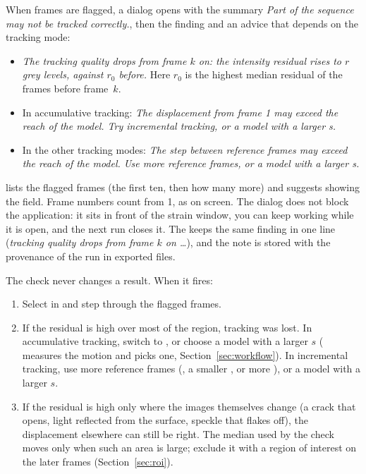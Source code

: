 When frames are flagged, a  dialog opens with the summary \emph{Part
of the sequence may not be tracked correctly.}, then the finding and an advice that depends on the
tracking mode:

\begin{itemize}
  \item \emph{The tracking quality drops from frame $k$ on: the intensity residual rises to $r$
        grey levels, against $r_0$ before.} Here $r_0$ is the highest median residual of the
        frames before frame~$k$.
  \item In accumulative tracking: \emph{The displacement from frame 1 may exceed the reach of the
        model. Try incremental tracking, or a model with a larger s.}
  \item In the other tracking modes: \emph{The step between reference frames may exceed the reach
        of the model. Use more reference frames, or a model with a larger s.}
\end{itemize}

 lists the flagged frames (the first ten, then how many more) and suggests
showing the  field. Frame numbers count from 1, as on screen. The dialog does not
block the application: it sits in front of the strain window, you can keep working while it is
open, and the next run closes it. The  keeps the same finding in one line
(\emph{tracking quality drops from frame $k$ on \ldots}), and the note is stored with the
provenance of the run in exported files.

The check never changes a result. When it fires:

\begin{enumerate}
  \item Select  in  and step through the flagged frames.
  \item If the residual is high over most of the region, tracking was lost. In accumulative
        tracking, switch  to , or choose a model with a larger
        $s$ ( measures the motion and picks one,
        Section~\ref{sec:workflow}). In incremental tracking, use more reference frames
        (, a smaller , or more ), or a model
        with a larger $s$.
  \item If the residual is high only where the images themselves change (a crack that opens,
        light reflected from the surface, speckle that flakes off), the displacement elsewhere
        can still be right. The median used by the check moves only when such an area is large;
        exclude it with a region of interest on the later frames (Section~\ref{sec:roi}).
\end{enumerate}

